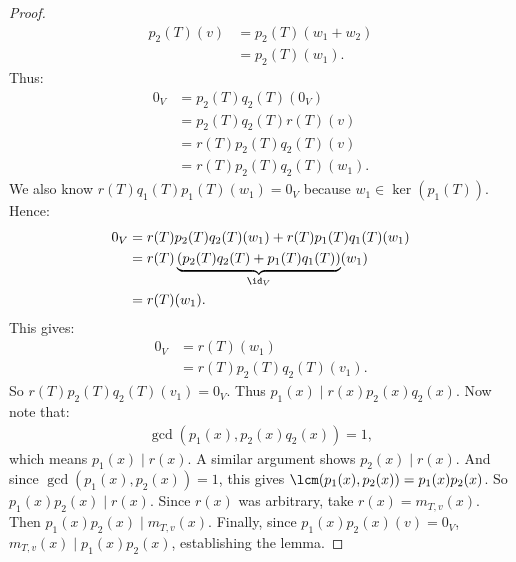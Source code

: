 \begin{proof}
\begin{equation*}
                \begin{split}
                    p_2(T)(v)
                    &  = p_2(T)(w_1 + w_2) \\
                    & = p_2(T)(w_1).
                \end{split}
                \end{equation*}
            Thus:
                \begin{equation*}
                \begin{split}
                    0_V 
                    & = p_2(T)q_2(T)(0_V) \\
                    & = p_2(T)q_2(T)r(T)(v) \\
                    & = r(T)p_2(T)q_2(T)(v) \\
                    & = r(T)p_2(T)q_2(T)(w_1).
                \end{split}
                \end{equation*}
            We also know $r(T)q_1(T)p_1(T)(w_1) = 0_V$ because $w_1 \in \ker(p_1(T))$. Hence:
                \begin{equation*}
                \begin{split}
                    0_V 
                    & = r(T)p_2(T)q_2(T)(w_1) + r(T)p_1(T)q_1(T)(w_1) \\
                    & = r(T)\underbrace{\left(p_2(T)q_2(T) + p_1(T)q_1(T)\right)}_{\id_V} (w_1) \\
                    & = r(T)(w_1).
                \end{split}
                \end{equation*}
            This gives:
                \begin{equation*}
                \begin{split}
                    0_V 
                    & = r(T)(w_1) \\
                    & = r(T)p_2(T)q_2(T)(v_1).
                \end{split}
                \end{equation*}
            So $r(T)p_2(T)q_2(T)(v_1) = 0_V$. Thus $p_1(x)\mid r(x)p_2(x)q_2(x)$. Now note that:
                \begin{equation*}
                \begin{split}
                    \gcd{(p_1(x),p_2(x)q_2(x))} = 1,
                \end{split}
                \end{equation*}
            which means $p_1(x)\mid r(x)$. A similar argument shows $p_2(x) \mid r(x)$. And since $\gcd(p_1(x),p_2(x)) = 1$, this gives $\lcm(p_1(x),p_2(x)) = p_1(x)p_2(x)$. So $p_1(x)p_2(x) \mid r(x)$. Since $r(x)$ was arbitrary, take $r(x) = m_{T,v}(x)$. Then $p_1(x)p_2(x) \mid m_{T,v}(x)$. Finally, since $p_1(x)p_2(x)(v) = 0_V$, $m_{T,v}(x) \mid p_1(x)p_2(x)$, establishing the lemma.
        \end{proof}

